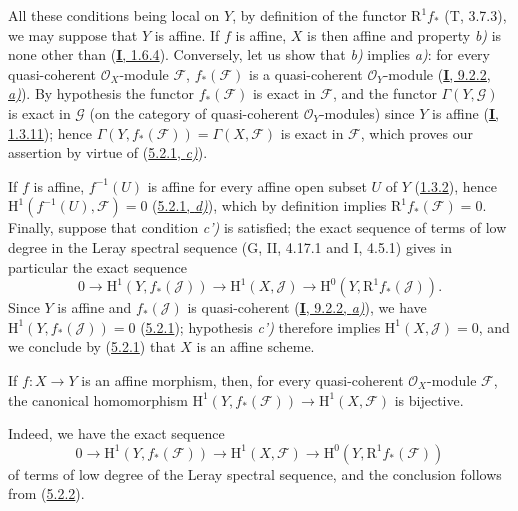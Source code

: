 All these conditions being local on $Y$, by definition of the functor
$\mathrm{R}^1f_*$ (T, 3.7.3), we may suppose that $Y$ is affine. If $f$
is affine, $X$ is then affine and property \emph{b)} is none other than
(\hyperref[I.1.6.4]{\textbf{I}, 1.6.4}). Conversely, let us show that \emph{b)} implies
\emph{a)}: for every quasi-coherent $\mathcal{O}_X$-module $\mathcal{F}$,
$f_*(\mathcal{F})$ is a quasi-coherent $\mathcal{O}_Y$-module
(\hyperref[I.9.2.2]{\textbf{I}, 9.2.2, \emph{a)}}). By hypothesis the functor
$f_*(\mathcal{F})$ is exact in $\mathcal{F}$, and the functor
$\Gamma(Y,\mathcal{G})$ is exact in $\mathcal{G}$ (on the category of
quasi-coherent $\mathcal{O}_Y$-modules) since $Y$ is affine
(\hyperref[I.1.3.11]{\textbf{I}, 1.3.11}); hence
$\Gamma(Y,f_*(\mathcal{F}))=\Gamma(X,\mathcal{F})$ is exact in
$\mathcal{F}$, which proves our assertion by virtue of
(\hyperref[II.5.2.1]{5.2.1, \emph{c)}}).

If $f$ is affine, $f^{-1}(U)$ is affine for every affine open subset $U$ of
$Y$ (\hyperref[II.1.3.2]{1.3.2}), hence
$\mathrm{H}^1(f^{-1}(U),\mathcal{F})=0$
(\hyperref[II.5.2.1]{5.2.1, \emph{d)}}), which by definition implies
$\mathrm{R}^1f_*(\mathcal{F})=0$. Finally, suppose that condition
\emph{c')} is satisfied; the exact sequence of terms of low degree in the
Leray spectral sequence (G, II, 4.17.1 and I, 4.5.1) gives in particular
the exact sequence
\[
  0\to\mathrm{H}^1(Y,f_*(\mathcal{J}))\to
  \mathrm{H}^1(X,\mathcal{J})\to
  \mathrm{H}^0(Y,\mathrm{R}^1f_*(\mathcal{J})).
\]
Since $Y$ is affine and $f_*(\mathcal{J})$ is quasi-coherent
(\hyperref[I.9.2.2]{\textbf{I}, 9.2.2, \emph{a)}}), we have
$\mathrm{H}^1(Y,f_*(\mathcal{J}))=0$
(\hyperref[II.5.2.1]{5.2.1}); hypothesis \emph{c')} therefore implies
$\mathrm{H}^1(X,\mathcal{J})=0$, and we conclude by
(\hyperref[II.5.2.1]{5.2.1}) that $X$ is an affine scheme.

\begin{corollary}[5.2.3]
\label{II.5.2.3}
If $f:X\to Y$ is an affine morphism, then, for every quasi-coherent
$\mathcal{O}_X$-module $\mathcal{F}$, the canonical homomorphism
$\mathrm{H}^1(Y,f_*(\mathcal{F}))\to\mathrm{H}^1(X,\mathcal{F})$ is
bijective.
\end{corollary}


Indeed, we have the exact sequence
\[
  0\to\mathrm{H}^1(Y,f_*(\mathcal{F}))\to
  \mathrm{H}^1(X,\mathcal{F})\to
  \mathrm{H}^0(Y,\mathrm{R}^1f_*(\mathcal{F}))
\]
of terms of low degree of the Leray spectral sequence, and the conclusion
follows from (\hyperref[II.5.2.2]{5.2.2}).

